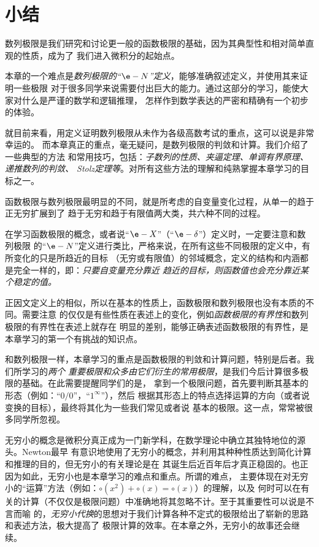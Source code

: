 \section*{小结}

数列极限是我们研究和讨论更一般的函数极限的基础，因为其典型性和相对简单直观的性质，成为了
我们进入微积分的起始点。

本章的一个难点是{\it 数列极限的“$\e-N$”定义}，能够准确叙述定义，并使用其来证明一些极限
对于很多同学来说需要付出巨大的能力。通过这部分的学习，能使大家对什么是严谨的数学和逻辑推理，
怎样作到数学表达的严密和精确有一个初步的体验。

就目前来看，用定义证明数列极限从未作为各级高数考试的重点，这可以说是非常幸运的。
而本章真正的重点，毫无疑问，是数列极限的判敛和计算。我们介绍了一些典型的方法
和常用技巧，包括：{\it 子数列的性质、夹逼定理、单调有界原理、递推数列的判敛、
Stolz定理等}。对所有这些方法的理解和纯熟掌握本章学习的目标之一。

函数极限与数列极限最明显的不同，就是所考虑的自变量变化过程，从单一的趋于正无穷扩展到了
趋于无穷和趋于有限值两大类，共六种不同的过程。

在学习函数极限的概念，或者说“$\e-X$”（“$\e-\delta$”）定义时，一定要注意和数列极限
的“$\e-N$”定义进行类比，严格来说，在所有这些不同极限的定义中，有所变化的只是所趋近的目标
（无穷或有限值）的邻域概念，定义的结构和内涵都是完全一样的，即：{\it 只要自变量充分靠近
趋近的目标，则函数值也会充分靠近某个稳定的值。}

正因文定义上的相似，所以在基本的性质上，函数极限和数列极限也没有本质的不同。需要注意
的仅仅是有些性质在表述上的变化，例如{\it 函数极限的有界性}和数列极限的有界性在表述上就存在
明显的差别，能够正确表述函数极限的有界性，是本章学习的第一个有挑战的知识点。

和数列极限一样，本章学习的重点是函数极限的判敛和计算问题，特别是后者。我们所学习的{\it 两个
重要极限和众多由它们衍生的常用极限}，是我们今后计算很多极限的基础。在此需要提醒同学们的是，
拿到一个极限问题，首先要判断其基本的形态（例如：“$0/0$”，“$1^{\infty}$”），然后
根据其形态上的特点选择运算的方向（或者说变换的目标），最终将其化为一些我们常见或者说
基本的极限。这一点，常常被很多同学所忽视。

无穷小的概念是微积分真正成为一门新学科，在数学理论中确立其独特地位的源头。Newton最早
有意识地使用了无穷小的概念，并利用其种种性质达到简化计算和推理的目的，但无穷小的有关理论是在
其诞生后近百年后才真正稳固的。也正因为如此，无穷小也是本章学习的难点和重点。所谓的难点，
主要体现在对无穷小的“运算”方法（例如：$\circ(x^2)+\circ(x)=\circ(x)$）的理解，以及
何时可以在有关的计算（不仅仅是极限问题）中准确地将其忽略不计。至于其重要性可以说是不言而喻
的，{\it 无穷小代换}的思想对于我们计算各种不定式的极限给出了崭新的思路和表述方法，极大提高了
极限计算的效率。在本章之外，无穷小的故事还会继续。

